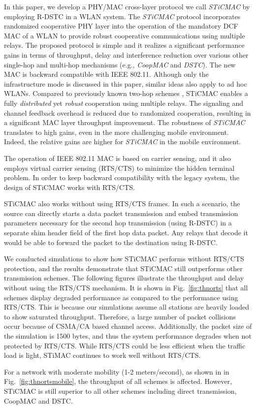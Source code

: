\documentclass[peerreview,draftcls,onecolumn,12pt,a4paper]{IEEEtran}
\begin{document}
In this paper, we develop a PHY/MAC cross-layer protocol we call
\emph{STiCMAC} by employing R-DSTC in a WLAN system. The
\emph{STiCMAC} protocol incorporates randomized cooperative PHY
layer into the operation of the mandatory DCF MAC of a WLAN to
provide robust cooperative communications using multiple relays. The proposed protocol
is simple and it realizes a significant performance gains in terms of throughput,
delay and interference reduction over various other single-hop and
multi-hop mechanisms (e.g., \emph{CoopMAC} and \emph{DSTC}).
The new MAC is backward compatible with IEEE 802.11. Although only the infrastructure mode is discussed in this paper,
similar ideas also apply to ad hoc WLANs. Compared to previously
known two-hop schemes \cite{coopmacliu, Jakllari06}, STiCMAC
enables a fully \emph{distributed} yet \emph{robust} cooperation
using multiple relays. The signaling and channel feedback overhead
is reduced due to randomized cooperation, resulting in a
significant MAC layer throughput improvement. The robustness of
\emph{STiCMAC} translates to high gains, even in the more
challenging mobile environment. Indeed, the relative gains are
higher for \emph{STiCMAC} in the mobile environment.

\newpage
\begin{appendix}
The operation of IEEE 802.11 MAC is based on carrier sensing, and it also employs virtual carrier sensing (RTS/CTS) to minimize the hidden terminal problem. In order to keep backward compatibility with the legacy system, the design of STiCMAC works with RTS/CTS. 

STiCMAC also works without using RTS/CTS frames. In such a scenario, the source can directly starts a data packet transmission and embed transmission parameters necessary for the second hop transmission (using R-DSTC) in a separate shim header field of the first hop data packet. Any relays that decode it would be able to forward the packet to the destination using R-DSTC.

We conducted simulations to show how STiCMAC performs without RTS/CTS protection, and the results demonstrate that STiCMAC still outperforms other transmission schemes. The following figures illustrate the throughput and delay without using the RTS/CTS mechanism. It is shown in Fig.~\ref{fig:thnorts} that all schemes display degraded performance as compared to the performance using RTS/CTS. This is because our simulations assume all stations are heavily loaded to show saturated throughput. Therefore, a large number of packet collisions occur because of CSMA/CA based channel access. Additionally, the packet size of the simulation is 1500 bytes, and thus the system performance degrades when not protected by RTS/CTS. While RTS/CTS could be less efficient when the traffic load is light,  STiMAC continues to work well without RTS/CTS. 

For a network with moderate mobility (1-2 meters/second), as shown in in Fig.~\ref{fig:thnortsmobile}, the throughput of all schemes is affected. However, STiCMAC is still superior to all other schemes including direct transmission, CoopMAC and DSTC. 
\end{appendix}
\end{document}
